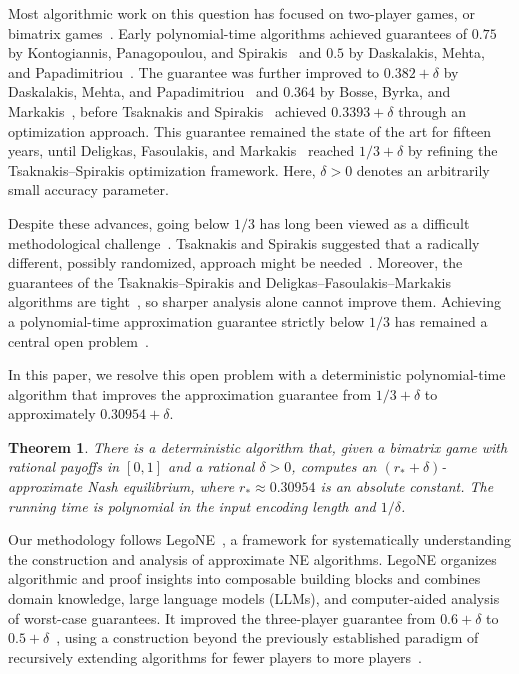 \documentclass[11pt]{article}
\newtheorem{theorem}{Theorem}
\theoremstyle{remark}
\theoremstyle{plain}
\begin{document}
Most algorithmic work on this question has focused on two-player games,
or bimatrix games~\cite{survey2024}.
Early polynomial-time algorithms achieved guarantees of $0.75$ by Kontogiannis,
Panagopoulou, and Spirakis~\cite{kontogiannis2009} and $0.5$ by Daskalakis,
Mehta, and Papadimitriou~\cite{daskalakisnote2009}. The guarantee was further
improved to $0.382+\delta$ by Daskalakis, Mehta, and
Papadimitriou~\cite{daskalakisprogress2007} and $0.364$ by Bosse, Byrka, and
Markakis~\cite{bbm2010}, before Tsaknakis and Spirakis~\cite{ts2008}
achieved $0.3393+\delta$ through an optimization approach. This guarantee
remained the state of the art for fifteen years, until Deligkas, Fasoulakis,
and Markakis~\cite{dfm2023} reached $1/3+\delta$ by refining the
Tsaknakis--Spirakis optimization framework. Here, $\delta>0$ denotes an arbitrarily small
accuracy parameter.

Despite these advances, going below $1/3$ has long been viewed as a difficult
methodological challenge~\cite{survey2024}. Tsaknakis and Spirakis suggested
that a radically different, possibly randomized, approach might be
needed~\cite{ts2008}. Moreover, the guarantees of the
Tsaknakis--Spirakis and Deligkas--Fasoulakis--Markakis algorithms are
tight~\cite{tightness2023}, so sharper analysis alone cannot improve them.
Achieving a polynomial-time approximation guarantee strictly below $1/3$
has remained a central open problem~\cite{survey2024}.

In this paper, we resolve this open problem with a deterministic
polynomial-time algorithm that improves the approximation guarantee from
$1/3+\delta$ to approximately $0.30954+\delta$.

\begin{theorem}
\label{thm:main}
There is a deterministic algorithm that, given a bimatrix game with rational
payoffs in $[0,1]$ and a rational $\delta>0$, computes an
$(r_*+\delta)$-approximate Nash equilibrium, where $r_*\approx 0.30954$
is an absolute constant. The running time is polynomial in the input encoding
length and $1/\delta$.
\end{theorem}

Our methodology follows LegoNE~\cite{legone2026,computeraided2026}, a framework
for systematically understanding the construction and analysis of approximate
NE algorithms. LegoNE organizes algorithmic and proof insights into composable
building blocks and combines domain knowledge, large language
models (LLMs),
and computer-aided analysis of worst-case guarantees. It improved the
three-player guarantee from $0.6+\delta$ to $0.5+\delta$~\cite{legone2026,computeraided2026},
using a construction beyond the previously established paradigm of
recursively extending algorithms for fewer players to more
players~\cite{bbm2010,hemon2008}.
\end{document}
